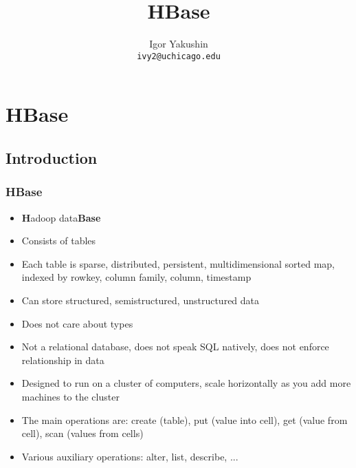 \documentclass{beamer}
\title{\huge{HBase}}
\author{Igor Yakushin \\ \texttt{ivy2@uchicago.edu}}
\begin{document}



\begin{frame}
\titlepage
\end{frame}


\section{HBase}
\subsection{Introduction}
\begin{frame}
  \frametitle{HBase}
  \begin{itemize}
  \item {\color{mycolordef}\textbf{H}}adoop data{\color{mycolordef}\textbf{Base}}
  \item Consists of tables
  \item Each table is sparse, distributed, persistent, multidimensional sorted map, indexed by rowkey, column family, column, timestamp
  \item Can store structured, semistructured, unstructured data
  \item Does not care about types
  \item Not a relational database, does not speak SQL natively, does not enforce relationship in data
  \item Designed to run on a cluster of computers, scale horizontally as you add more machines to the cluster
  \item The main operations are: create (table), put (value into cell), get (value from cell), scan (values from cells)
  \item Various auxiliary operations: alter, list, describe, ...
  \end{itemize}
\end{frame}
\end{document}
